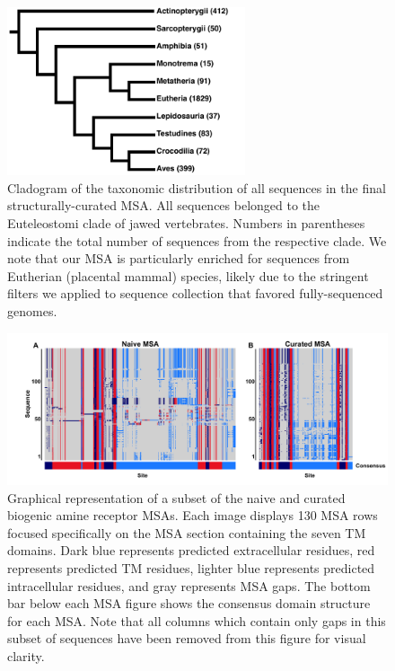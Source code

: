 \documentclass[fleqn,10pt]{wlpeerj}
\begin{document}
\begin{figure}[htbp]
	\centerline{\includegraphics[width=7cm]{figures/taxonomic_distribution.pdf}}
	\caption{\label{taxa_dist} Cladogram of the taxonomic distribution of all sequences in the final structurally-curated MSA. All sequences belonged to the Euteleostomi clade of jawed vertebrates. Numbers in parentheses indicate the total number of sequences from the respective clade. We note that our MSA is particularly enriched for sequences from Eutherian (placental mammal) species, likely due to the stringent filters we applied to sequence collection that favored fully-sequenced genomes.}
\end{figure}

\vspace*{4cm}


\begin{figure}[htbp]
	\centerline{\includegraphics[width=8in]{figures/domains_struc_naive.png}}
	\caption{\label{domains} Graphical representation of a subset of the naive and curated biogenic amine receptor MSAs. Each image displays 130 MSA rows focused specifically on the MSA section containing the seven TM domains. Dark blue represents predicted extracellular residues, red represents predicted TM residues, lighter blue represents predicted intracellular residues, and gray represents MSA gaps. The bottom bar below each MSA figure shows the consensus domain structure for each MSA. Note that all columns which contain only gaps in this subset of sequences have been removed from this figure for visual clarity.}
\end{figure}
\end{document}
